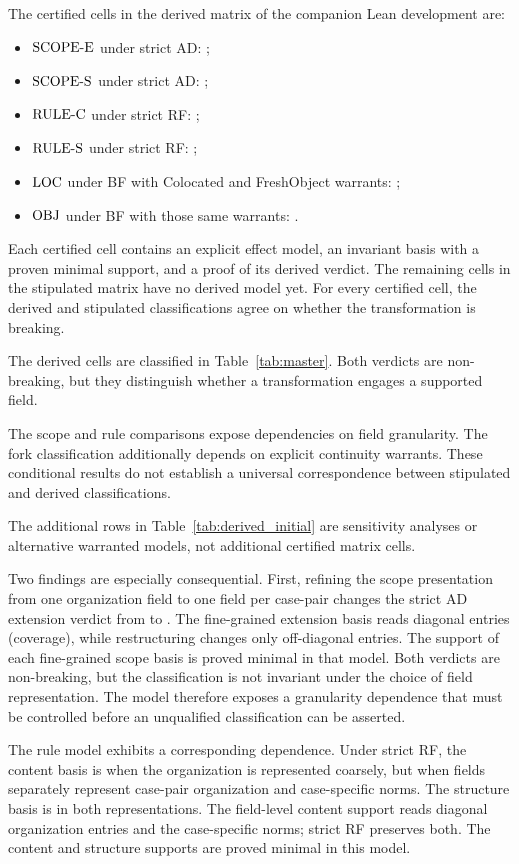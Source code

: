 The certified cells in the derived matrix of the companion Lean
development are:

\begin{itemize}
  \item $\mathrm{SCOPE\text{-}E}$ under strict AD: \NEU;
  \item $\mathrm{SCOPE\text{-}S}$ under strict AD: \BRK;
  \item $\mathrm{RULE\text{-}C}$ under strict RF: \NEU;
  \item $\mathrm{RULE\text{-}S}$ under strict RF: \BRK;
  \item $\mathrm{LOC}$ under BF with Colocated and FreshObject warrants: \NEU;
  \item $\mathrm{OBJ}$ under BF with those same warrants: \BRK.
\end{itemize}

Each certified cell contains an explicit effect model,
an invariant basis with a proven minimal support,
and a proof of its derived verdict.
The remaining cells in the stipulated matrix
have no derived model yet.
For every certified cell, the derived and stipulated
classifications agree on whether the transformation is breaking.

The derived \NEU{} cells are classified \PRS{}
in Table~\ref{tab:master}.
Both verdicts are non-breaking, but they distinguish
whether a transformation engages a supported field.

The scope and rule comparisons expose dependencies on
field granularity.
The fork classification additionally depends on explicit
continuity warrants.
These conditional results do not establish a universal
correspondence between stipulated and derived classifications.

The additional rows in Table~\ref{tab:derived_initial}
are sensitivity analyses or alternative warranted models,
not additional certified matrix cells.

Two findings are especially consequential.
First, refining the scope presentation from one organization field
to one field per case-pair changes the strict AD extension verdict
from \PRS{} to \NEU{}.
The fine-grained extension basis reads diagonal entries (coverage),
while restructuring changes only off-diagonal entries.
The support of each fine-grained scope basis is proved minimal in that
model.
Both verdicts are non-breaking, but the classification is
not invariant under the choice of field representation.
The model therefore exposes a granularity dependence that must be
controlled before an unqualified classification can be asserted.

The rule model exhibits a corresponding dependence.
Under strict RF, the content basis is \PRS{} when the organization
is represented coarsely, but \NEU{} when fields separately
represent case-pair organization and case-specific norms.
The structure basis is \BRK{} in both representations.
The field-level content support reads diagonal organization
entries and the case-specific norms; strict RF preserves both.
The content and structure supports are proved minimal in this model.

